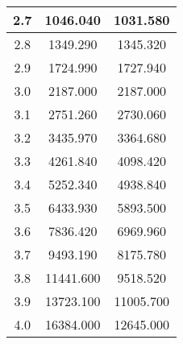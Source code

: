 \begin{table}[h!]
\begin{tabular}{|c|c|c|}
        2.7        & 1046.040       & 1031.580                                     \\ \hline
        2.8        & 1349.290       & 1345.320                                     \\ \hline
        2.9        & 1724.990       & 1727.940                                     \\ \hline
        3.0        & 2187.000       & 2187.000                                     \\ \hline
        3.1        & 2751.260       & 2730.060                                     \\ \hline
        3.2        & 3435.970       & 3364.680                                     \\ \hline
        3.3        & 4261.840       & 4098.420                                     \\ \hline
        3.4        & 5252.340       & 4938.840                                     \\ \hline
        3.5        & 6433.930       & 5893.500                                     \\ \hline
        3.6        & 7836.420       & 6969.960                                     \\ \hline
        3.7        & 9493.190       & 8175.780                                     \\ \hline
        3.8        & 11441.600      & 9518.520                                     \\ \hline
        3.9        & 13723.100      & 11005.700                                    \\ \hline
        4.0        & 16384.000      & 12645.000                                    \\ \hline
    \end{tabular}\label{tab:table6}
\end{table}
